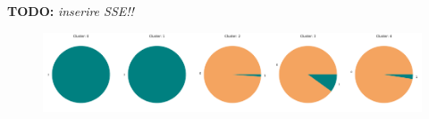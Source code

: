 \documentclass[10pt,a4paper]{report}
\begin{document}
\textbf{TODO:} \textit{inserire SSE!!}
\begin{figure}[h]
	\centering
	\begin{minipage}{0.75\textwidth}
		\includegraphics[width=0.2\textwidth]{xmeans_0}\includegraphics[width=0.2\textwidth]{xmeans_1}\includegraphics[width=0.2\textwidth]{xmeans_2}\includegraphics[width=0.2\textwidth]{xmeans_3}\includegraphics[width=0.2\textwidth]{xmeans_4}

\end{minipage}
\end{figure}
\end{document}
